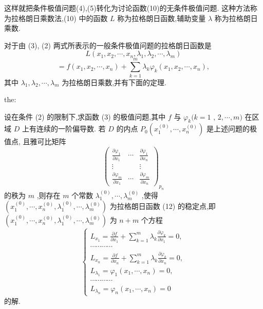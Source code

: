 这样就把条件极值问题(4),(5)转化为讨论函数(10)的无条件极值问题. 这种方法称为拉格朗日乘数法,(10) 中的函数 \(L\) 称为拉格朗日函数,辅助变量 \(\lambda\) 称为拉格朗日乘数.

对于由 (3), (2) 两式所表示的一般条件极值问题的拉格朗日函数是
\[
L\left( {{x}_{1},{x}_{2},\cdots ,{x}_{n},{\lambda }_{1},{\lambda }_{2},\cdots ,{\lambda }_{m}}\right)
\]
\[
= f\left( {{x}_{1},{x}_{2},\cdots ,{x}_{n}}\right)  + \mathop{\sum }\limits_{{k = 1}}^{m}{\lambda }_{k}{\varphi }_{k}\left( {{x}_{1},{x}_{2},\cdots ,{x}_{n}}\right) , \tag{12}
\]
其中 \({\lambda }_{1},{\lambda }_{2},\cdots ,{\lambda }_{m}\) 为拉格朗日乘数,并有下面的定理.

\begin{theorem}{}{the:}

\end{theorem}
 设在条件 (2) 的限制下,求函数 (3) 的极值问题,其中 \(f\) 与 \({\varphi }_{k}(k = 1\) , \(2,\cdots ,m)\) 在区域 \(D\) 上有连续的一阶偏导数. 若 \(D\) 的内点 \({P}_{0}\left( {{x}_{1}^{\left( 0\right) },\cdots ,{x}_{n}^{\left( 0\right) }}\right)\) 是上述问题的极值点, 且雅可比矩阵
\[
{\left( \begin{matrix} \frac{\partial {\varphi }_{1}}{\partial {x}_{1}} & \cdots & \frac{\partial {\varphi }_{1}}{\partial {x}_{n}} \\  \vdots & & \vdots \\  \frac{\partial {\varphi }_{m}}{\partial {x}_{1}} & \cdots & \frac{\partial {\varphi }_{m}}{\partial {x}_{n}} \end{matrix}\right) }_{{p}_{n}} \tag{13}
\]
的秩为 \(m\) ,则存在 \(m\) 个常数 \({\lambda }_{1}^{\left( 0\right) },\cdots ,{\lambda }_{m}^{\left( 0\right) }\) ,使得 \(\left( {{x}_{1}^{\left( 0\right) },\cdots ,{x}_{n}^{\left( 0\right) },{\lambda }_{1}^{\left( 0\right) },\cdots ,{\lambda }_{m}^{\left( 0\right) }}\right)\) 为拉格朗日函数 (12) 的稳定点,即 \(\left( {{x}_{1}^{\left( 0\right) },\cdots ,{x}_{n}^{\left( 0\right) },{\lambda }_{1}^{\left( 0\right) },\cdots ,{\lambda }_{m}^{\left( 0\right) }}\right)\) 为 \(n + m\) 个方程
\[
\left\{  \begin{array}{l} {L}_{{x}_{1}} = \frac{\partial f}{\partial {x}_{1}} + \mathop{\sum }\limits_{{k = 1}}^{m}{\lambda }_{k}\frac{\partial {\varphi }_{k}}{\partial {x}_{1}} = 0, \\  \cdots \cdots \cdots \cdots \\  {L}_{{x}_{n}} = \frac{\partial f}{\partial {x}_{n}} + \mathop{\sum }\limits_{{k = 1}}^{m}{\lambda }_{k}\frac{\partial {\varphi }_{k}}{\partial {x}_{n}} = 0, \\  {L}_{{\lambda }_{1}} = {\varphi }_{1}\left( {{x}_{1},\cdots ,{x}_{n}}\right)  = 0, \\  \cdots \cdots \cdots \cdots \\  {L}_{{\lambda }_{n}} = {\varphi }_{n}\left( {{x}_{1},\cdots ,{x}_{n}}\right)  = 0 \end{array}\right.
\]
的解.


